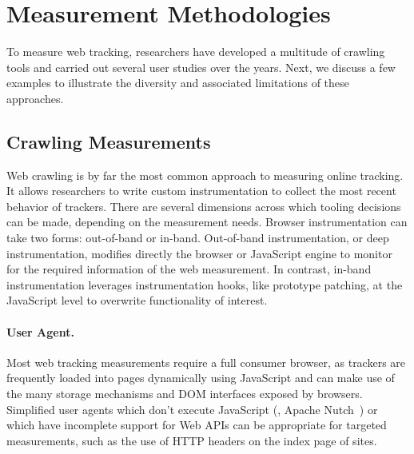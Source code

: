 \section{Measurement Methodologies}
\label{sec:measurement-methodologies}

To measure web tracking, researchers have developed a multitude of crawling tools and carried out several user studies over the years. Next, we discuss a few examples to illustrate the diversity and associated limitations of these approaches.


\subsection{Crawling Measurements}
\label{sec:crawling}

Web crawling is by far the most common approach to measuring online tracking. It allows researchers to write custom instrumentation to collect the most recent behavior of trackers. There are several dimensions across which tooling decisions can be made, depending on the measurement needs. Browser instrumentation can take two forms: out-of-band or in-band. Out-of-band instrumentation, or deep instrumentation, modifies directly the browser or JavaScript engine to monitor for the required information of the web measurement. In contrast, in-band instrumentation leverages instrumentation hooks, like prototype patching, at the JavaScript level to overwrite functionality of interest. 

\paragraph{User Agent.} Most web tracking measurements require a full consumer browser, as trackers are frequently loaded into pages dynamically using JavaScript and can make use of the many storage mechanisms and DOM interfaces exposed by browsers. Simplified user agents which don't execute JavaScript (\eg{}, Apache Nutch~\cite{apache-nutch}) or which have incomplete support for Web APIs can be appropriate for targeted measurements, such as the use of HTTP headers on the index page of sites. 

